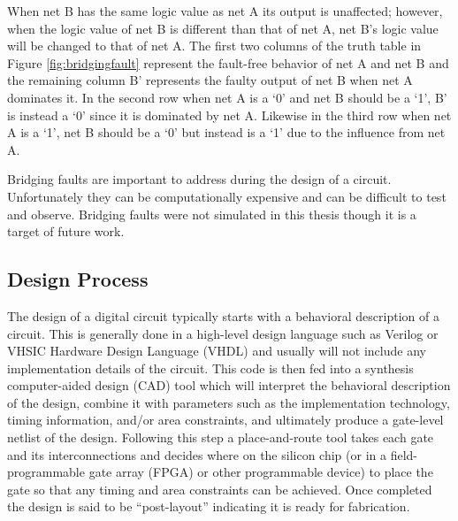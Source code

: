 \documentclass[12pt]{report}
\begin{document}
When net B has the same logic value as net A its output is unaffected; however, when the logic value of net B is different than that of net A, net B's logic value will be changed to that of net A.  The first two columns of the truth table in Figure \ref{fig:bridgingfault} represent the fault-free behavior of net A and net B and the remaining column B' represents the faulty output of net B when net A dominates it.  In the second row when net A is a `0' and net B should be a `1', B' is instead a `0' since it is dominated by net A.  Likewise in the third row when net A is a `1', net B should be a `0' but instead is a `1' due to the influence from net A.

Bridging faults are important to address during the design of a circuit.  Unfortunately they can be computationally expensive and can be difficult to test and observe\cite{stroud-bridging}.  Bridging faults were not simulated in this thesis though it is a target of future work.

\subsection{Design Process}
\label{sct:designprocess}
The design of a digital circuit typically starts with a behavioral description of a circuit.  This is generally done in a high-level design language such as Verilog or VHSIC Hardware Design Language (VHDL) and usually will not include any implementation details of the circuit\cite{advancedverilog}.  This code is then fed into a synthesis computer-aided design (CAD) tool which will interpret the behavioral description of the design, combine it with parameters such as the implementation technology, timing information, and/or area constraints, and ultimately produce a gate-level netlist of the design\cite{advancedverilog}.  Following this step a place-and-route tool takes each gate and its interconnections and decides where on the silicon chip (or in a field-programmable gate array (FPGA) or other programmable device) to place the gate so that any timing and area constraints can be achieved.  Once completed the design is said to be ``post-layout'' indicating it is ready for fabrication\cite{advancedverilog}.
\end{document}
